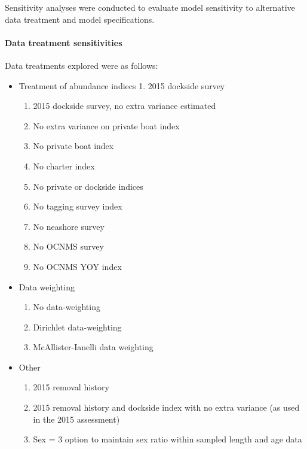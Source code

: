 \documentclass[11pt,
  letterpaper,
]{article}
\providecommand{\tightlist}{%
  \setlength{\itemsep}{0pt}\setlength{\parskip}{0pt}}
\providecommand{\tightlist}{%
  \setlength{\itemsep}{0pt}\setlength{\parskip}{0pt}}
\begin{document}
Sensitivity analyses were conducted to evaluate model sensitivity to alternative data treatment and model specifications.

\hypertarget{data-treatment-sensitivities}{%
\paragraph{Data treatment sensitivities}\label{data-treatment-sensitivities}}

Data treatments explored were as follows:

\begin{itemize}
\tightlist
\item
  Treatment of abundance indiecs 1. 2015 dockside survey

  \begin{enumerate}
  \def\labelenumi{\arabic{enumi}.}
  \setcounter{enumi}{1}
  \tightlist
  \item
    2015 dockside survey, no extra variance estimated
  \item
    No extra variance on private boat index
  \item
    No private boat index
  \item
    No charter index
  \item
    No private or dockside indices
  \item
    No tagging survey index
  \item
    No neashore survey
  \item
    No OCNMS survey
  \item
    No OCNMS YOY index
  \end{enumerate}
\item
  Data weighting

  \begin{enumerate}
  \def\labelenumi{\arabic{enumi}.}
  \setcounter{enumi}{10}
  \tightlist
  \item
    No data-weighting
  \item
    Dirichlet data-weighting
  \item
    McAllister-Ianelli data weighting
  \end{enumerate}
\item
  Other

  \begin{enumerate}
  \def\labelenumi{\arabic{enumi}.}
  \setcounter{enumi}{13}
  \tightlist
  \item
    2015 removal history
  \item
    2015 removal history and dockside index with no extra variance (as used in the 2015 assessment)
  \item
    Sex = 3 option to maintain sex ratio within sampled length and age data
  \end{enumerate}
\end{itemize}
\end{document}
